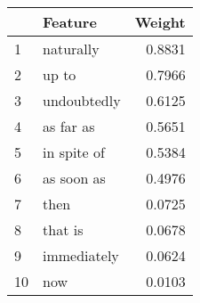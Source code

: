 \begin{tabular}{llr}
\toprule
{} &      Feature &  Weight \\
\midrule
1  &    naturally &  0.8831 \\
2  &        up to &  0.7966 \\
3  &  undoubtedly &  0.6125 \\
4  &    as far as &  0.5651 \\
5  &  in spite of &  0.5384 \\
6  &   as soon as &  0.4976 \\
7  &         then &  0.0725 \\
8  &      that is &  0.0678 \\
9  &  immediately &  0.0624 \\
10 &          now &  0.0103 \\
\bottomrule
\end{tabular}
